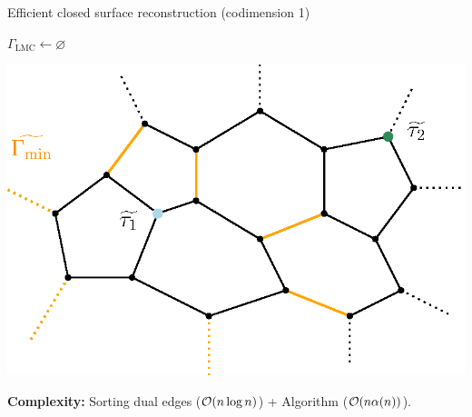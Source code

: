 \begin{frame}[c]{Efficient closed surface reconstruction (codimension 1)}
	\scriptsize
	\begin{minipage}[c]{0.5\linewidth}
		\begin{algorithm}[H]

			\alert<+|handout:0>{$\Gamma_{\operatorname{LMC}} \leftarrow \varnothing$} \\
			\alert<+|handout:0>{ {
			}}
			
		\end{algorithm}
	\end{minipage}%
	\begin{minipage}[c]{0.5\linewidth}
		\includegraphics[width=\linewidth]{dual/dual_problem}
	\end{minipage}

	\textbf{Complexity:} Sorting dual edges ($\mathcal{O}(n \log n)$) + Algorithm ($\mathcal{O}(n \alpha(n))$).

\end{frame}

